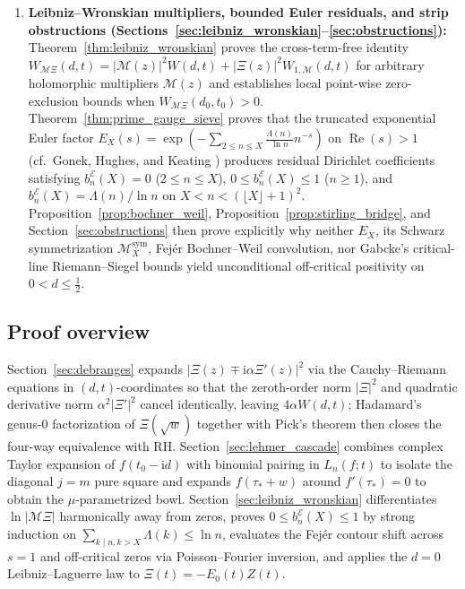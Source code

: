 \documentclass[11pt,reqno]{amsart}
\theoremstyle{definition}
\theoremstyle{remark}
\numberwithin{equation}{section}
\newcommand{\ii}{\mathrm{i}}
\newcommand{\Rea}{\operatorname{Re}}
\begin{document}
\begin{enumerate}[label=\textup{(\arabic*)},leftmargin=2.2em]
  \item \textbf{Leibniz--Wronskian multipliers, bounded Euler residuals, and strip obstructions (Sections~\ref{sec:leibniz_wronskian}--\ref{sec:obstructions}):} Theorem~\ref{thm:leibniz_wronskian} proves the cross-term-free identity $W_{\mathcal{M}\Xi}(d,t) = \lvert\mathcal{M}(z)\rvert^2 W(d,t) + \lvert\Xi(z)\rvert^2 W_{1,\mathcal{M}}(d,t)$ for arbitrary holomorphic multipliers $\mathcal{M}(z)$ and establishes local point-wise zero-exclusion bounds when $W_{\mathcal{M}\Xi}(d_0,t_0) > 0$. Theorem~\ref{thm:prime_gauge_sieve} proves that the truncated exponential Euler factor $E_X(s) = \exp(-\sum_{2\le n\le X}\frac{\Lambda(n)}{\ln n}n^{-s})$ on $\Rea(s) > 1$ (cf.\ Gonek, Hughes, and Keating \cite{GonekHughesKeating2007}) produces residual Dirichlet coefficients satisfying $b_n^{\mathcal{E}}(X) = 0$ ($2 \le n \le X$), $0 \le b_n^{\mathcal{E}}(X) \le 1$ ($n \ge 1$), and $b_n^{\mathcal{E}}(X) = \Lambda(n)/\ln n$ on $X < n < (\lfloor X\rfloor+1)^2$. Proposition~\ref{prop:bochner_weil}, Proposition~\ref{prop:stirling_bridge}, and Section~\ref{sec:obstructions} then prove explicitly why neither $E_X$, its Schwarz symmetrization $\mathcal{M}_X^{\mathrm{sym}}$, Fej\'er Bochner--Weil convolution, nor Gabcke's critical-line Riemann--Siegel bounds \cite{Gabcke1979} yield unconditional off-critical positivity on $0 < d \le \frac{1}{2}$.
\end{enumerate}

\subsection{Proof overview}\label{subsec:proof_overview}

Section~\ref{sec:debranges} expands $\lvert\Xi(z) \mp \ii\alpha\Xi'(z)\rvert^2$ via the Cauchy--Riemann equations in $(d,t)$-coordinates so that the zeroth-order norm $\lvert\Xi\rvert^2$ and quadratic derivative norm $\alpha^2\lvert\Xi'\rvert^2$ cancel identically, leaving $4\alpha W(d,t)$; Hadamard's genus-$0$ factorization of $\Xi(\sqrt{w})$ together with Pick's theorem then closes the four-way equivalence with RH. Section~\ref{sec:lehmer_cascade} combines complex Taylor expansion of $f(t_0 - \ii d)$ with binomial pairing in $L_n(f; t)$ to isolate the diagonal $j=m$ pure square and expands $f(\tau_* + w)$ around $f'(\tau_*) = 0$ to obtain the $\mu$-parametrized bowl. Section~\ref{sec:leibniz_wronskian} differentiates $\ln\lvert\mathcal{M}\Xi\rvert$ harmonically away from zeros, proves $0 \le b_n^{\mathcal{E}}(X) \le 1$ by strong induction on $\sum_{k\mid n, k>X}\Lambda(k) \le \ln n$, evaluates the Fej\'er contour shift across $s=1$ and off-critical zeros via Poisson--Fourier inversion, and applies the $d=0$ Leibniz--Laguerre law to $\Xi(t) = -E_0(t)Z(t)$.
\end{document}
